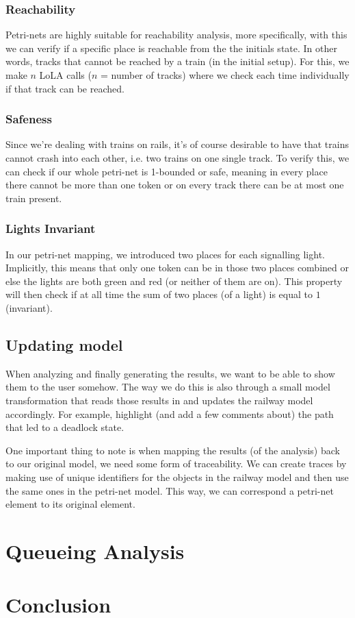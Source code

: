 \documentclass{article}
\begin{document}
\subsubsection{Reachability}

Petri-nets are highly suitable for reachability analysis, more specifically, with this we can verify if a specific place is reachable from the the initials state. In other words, tracks that cannot be reached by a train (in the initial setup). For this, we make $n$ LoLA calls ($n$ = number of tracks) where we check each time individually if that track can be reached.

\subsubsection{Safeness}

Since we're dealing with trains on rails, it's of course desirable to have that trains cannot crash into each other, i.e. two trains on one single track. To verify this, we can check if our whole petri-net is 1-bounded or safe, meaning in every place there cannot be more than one token or on every track there can be at most one train present.

\subsubsection{Lights Invariant}

In our petri-net mapping, we introduced two places for each signalling light. Implicitly, this means that only one token can be in those two places combined or else the lights are both green and red (or neither of them are on). This property will then check if at all time the sum of two places (of a light) is equal to $1$ (invariant).

\subsection{Updating model}
\label{safety_updating}

When analyzing and finally generating the results, we want to be able to show them to the user somehow. The way we do this is also through a small model transformation that reads those results in and updates the railway model accordingly. For example, highlight (and add a few comments about) the path that led to a deadlock state.

One important thing to note is when mapping the results (of the analysis) back to our original model, we need some form of traceability. We can create traces by making use of unique identifiers for the objects in the railway model and then use the same ones in the petri-net model. This way, we can correspond a petri-net element to its original element.


\section{Queueing Analysis}

\section{Conclusion}


\nocite{*}

\end{document}
